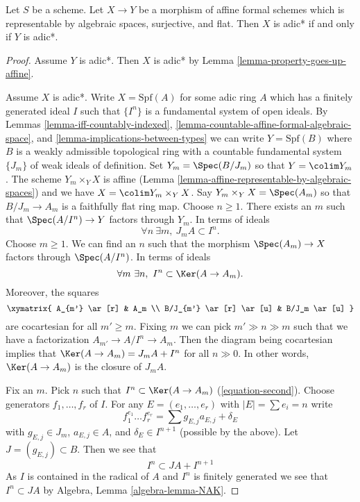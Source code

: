 \begin{lemma}
\label{lemma-iff-adic-star}
Let $S$ be a scheme. Let $X \to Y$ be a morphism of affine
formal schemes which is representable by algebraic spaces,
surjective, and flat. Then $X$ is adic* if and only if $Y$ is adic*.
\end{lemma}

\begin{proof}
Assume $Y$ is adic*. Then $X$ is adic* by
Lemma \ref{lemma-property-goes-up-affine}.

\medskip\noindent
Assume $X$ is adic*. Write $X = \text{Spf}(A)$ for some adic ring $A$
which has a finitely generated ideal $I$ such that $\{I^n\}$ is a
fundamental system of open ideals. By
Lemmas \ref{lemma-iff-countably-indexed},
\ref{lemma-countable-affine-formal-algebraic-space}, and
\ref{lemma-implications-between-types}
we can write $Y = \text{Spf}(B)$ where $B$ is a weakly admissible
topological ring with a countable fundamental system $\{J_m\}$ of
weak ideals of definition. Set $Y_m = \Spec(B/J_m)$ so that
$Y = \colim Y_m$. The scheme $Y_m \times_Y X$ is affine
(Lemma \ref{lemma-affine-representable-by-algebraic-spaces})
and we have $X = \colim Y_m \times_Y X$. Say $Y_m \times_Y X = \Spec(A_m)$
so that $B/J_m \to A_m$ is a faithfully flat ring map.
Choose $n \geq 1$. There exists an $m$ such that $\Spec(A/I^n) \to Y$
factors through $Y_m$. In terms of ideals
\begin{equation}
\label{equation-first}
\forall n\ \exists m,\ J_m A \subset I^n.
\end{equation}
Choose $m \geq 1$. We can find an $n$ such that the morphism
$\Spec(A_m) \to X$ factors through $\Spec(A/I^n)$. In terms of ideals
\begin{equation}
\label{equation-second}
\forall m\ \exists n,\ I^n \subset \Ker(A \to A_m).
\end{equation}
Moreover, the squares
$$
\xymatrix{
A_{m'} \ar[r] & A_m \\
B/J_{m'} \ar[r] \ar[u] & B/J_m \ar[u]
}
$$
are cocartesian for all $m' \geq m$. Fixing $m$ we can pick
$m' \gg n \gg m$ such that we have a factorization
$A_{m'} \to A/I^n \to A_m$. Then the diagram being cocartesian
implies that $\Ker(A \to A_m) = J_mA + I^n$ for all $n \gg 0$.
In other words, $\Ker(A \to A_m)$ is the closure of $J_mA$.

\medskip\noindent
Fix an $m$. Pick $n$ such that $I^n \subset \Ker(A \to A_m)$
(\ref{equation-second}). Choose generators $f_1, \ldots, f_r$
of $I$. For any $E = (e_1, \ldots, e_r)$ with $|E| = \sum e_i = n$ write
$$
f_1^{e_1} \ldots f_r^{e_r} =
\sum g_{E, j} a_{E, j} + \delta_E
$$
with $g_{E, j} \in J_m$, $a_{E, j} \in A$, and $\delta_E \in I^{n + 1}$
(possible by the above). Let $J = (g_{E, j}) \subset B$.
Then we see that
$$
I^n \subset J A + I^{n + 1}
$$
As $I$ is contained in the radical of $A$ and $I^n$ is finitely generated
we see that $I^n \subset JA$ by Algebra, Lemma \ref{algebra-lemma-NAK}.


\end{proof}

